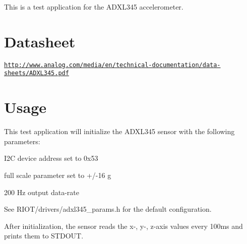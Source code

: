 This is a test application for the A\+D\+X\+L345 accelerometer.

\section*{Datasheet}

\href{http://www.analog.com/media/en/technical-documentation/data-sheets/ADXL345.pdf}{\tt http\+://www.\+analog.\+com/media/en/technical-\/documentation/data-\/sheets/\+A\+D\+X\+L345.\+pdf}

\section*{Usage}

This test application will initialize the A\+D\+X\+L345 sensor with the following parameters\+:
\begin{DoxyItemize}
\item I2C device address set to 0x53
\item full scale parameter set to +/-\/16 g
\item 200 Hz output data-\/rate
\end{DoxyItemize}

See R\+I\+O\+T/drivers/adxl345\+\_\+params.\+h for the default configuration.

After initialization, the sensor reads the x-\/, y-\/, z-\/axis values every 100ms and prints them to S\+T\+D\+O\+UT. 